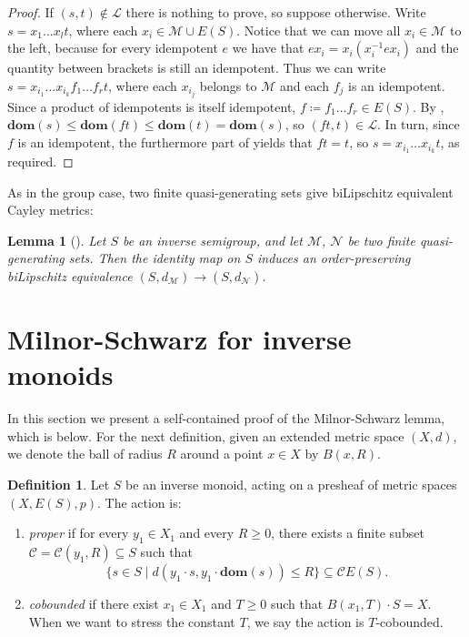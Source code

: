 \documentclass[svgnames]{amsart}
\theoremstyle{plain}
\newtheorem{lem}[thm]{Lemma}
\theoremstyle{definition}
\newtheorem{defn}[thm]{Definition}
\newcommand{\dom}[1]{\mathbf{dom}\left(#1\right)}
\begin{document}
\begin{proof} If $(s,t)\not\in \mathcal {L}$ there is nothing to prove, so suppose otherwise. Write $s= x_1\ldots x_l t$, where each $x_i\in \mathcal M\cup E(S)$. Notice that we can move all $x_i\in \mathcal M$ to the left, because for every idempotent $e$ we have that $ex_i=x_{i}(x_{i}^{-1}ex_{i})$ and the quantity between brackets is still an idempotent. Thus we can write $s= x_{i_1}\ldots x_{i_k} f_1\ldots f_r t$, where each $x_{i_j}$ belongs to $\mathcal M$ and each $f_j$ is an idempotent. Since a product of idempotents is itself idempotent, $f\coloneq f_1\ldots f_r\in E(S)$. By , $\dom{s}\le \dom{ft}\le \dom{t}=\dom{s}$, so $(ft,t)\in \mathcal L$. In turn, since $f$ is an idempotent, the furthermore part of  yields that $ft=t$, so $s= x_{i_1}\ldots x_{i_k}t$, as required. 
\end{proof}
\noindent As in the group case, two finite quasi-generating sets give biLipschitz equivalent Cayley metrics:

\begin{lem}[{\cite[Prop. 5.2.4]{magan2021amenability}}]\label{lem:compare_cayley_metrics}
    Let $S$ be an inverse semigroup, and let $\mathcal{M}$, $\mathcal N$ be two finite quasi-generating sets. Then the identity map on $S$ induces an order-preserving biLipschitz equivalence $(S,d_{\mathcal{M}})\to (S,d_{\mathcal N})$.
\end{lem}



\section{Milnor-Schwarz for inverse monoids}
In this section we present a self-contained proof of the Milnor-Schwarz lemma, which is  below. For the next definition, given an extended metric space $(X,d)$, we denote the ball of radius $R$ around a point $x\in X$ by $B(x,R)$.
\begin{defn}\label{defn:proper_and_cobounded}
Let  $S$ be an inverse monoid, acting on a presheaf of metric spaces $(X,E(S),p)$. The action is:
\begin{enumerate}
	\item \emph{proper} if for every $y_1\in X_1$ and every $R\ge 0$, there exists a finite subset $\mathcal{C}=\mathcal{C}(y_1,R)\subseteq S$ such that
	\[
		\{ s \in S \mid d(y_1 \cdot s, y_1\cdot \dom{s})\le R\}\subseteq \mathcal{C} E(S).
	\]
    \item \emph{cobounded} if there exist $x_1\in X_1$ and $T\ge 0$ such that $B(x_1,T) \cdot S = X$. When we want to stress the constant $T$, we say the action is $T$-cobounded.
\end{enumerate}
\end{defn}
\end{document}
